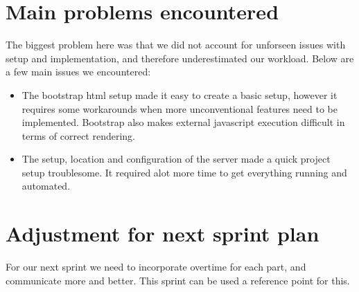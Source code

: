 \documentclass[11pt]{article}
\begin{document}
\newpage

\section*{Main problems encountered}

The biggest problem here was that we did not account for unforseen issues with setup and implementation, and therefore underestimated our workload. Below are a few main issues we encountered:
\begin{itemize}

	\item The bootstrap html setup made it easy to create a basic setup, however it requires some workarounds when more unconventional features need to be implemented. Bootstrap also makes external javascript execution difficult in terms of correct rendering.

	\item The setup, location and configuration of the server made a quick project setup troublesome. It required alot more time to get everything running and automated.

\end{itemize}

\section*{Adjustment for next sprint plan}

For our next sprint we need to incorporate overtime for each part, and communicate more and better. This sprint can be used a reference point for this.








	
\end{document}
